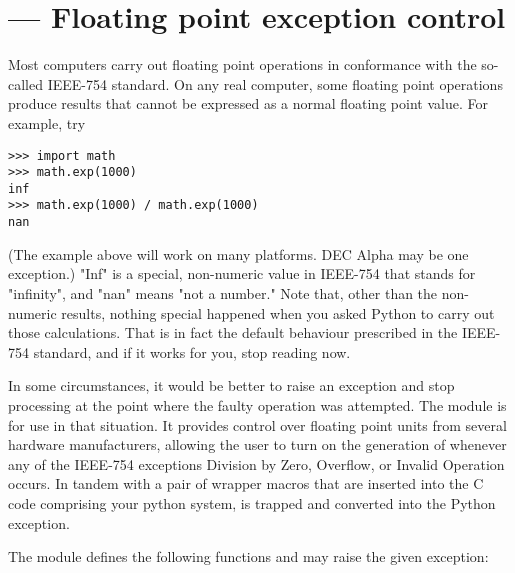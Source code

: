 \section{ ---
         Floating point exception control}



Most computers carry out floating point operations
in conformance with the so-called IEEE-754 standard.
On any real computer,
some floating point operations produce results that cannot
be expressed as a normal floating point value.
For example, try

\begin{verbatim}
>>> import math
>>> math.exp(1000)
inf
>>> math.exp(1000) / math.exp(1000)
nan
\end{verbatim}

(The example above will work on many platforms.
DEC Alpha may be one exception.)
"Inf" is a special, non-numeric value in IEEE-754 that
stands for "infinity", and "nan" means "not a number."
Note that,
other than the non-numeric results,
nothing special happened when you asked Python
to carry out those calculations.
That is in fact the default behaviour prescribed in the IEEE-754 standard,
and if it works for you,
stop reading now.

In some circumstances,
it would be better to raise an exception and stop processing
at the point where the faulty operation was attempted.
The  module
is for use in that situation.
It provides control over floating point
units from several hardware manufacturers,
allowing the user to turn on the generation
of  whenever any of the
IEEE-754 exceptions Division by Zero, Overflow, or
Invalid Operation occurs.
In tandem with a pair of wrapper macros that are inserted
into the C code comprising your python system,
 is trapped and converted into the Python
 exception.

The  module defines the following functions and
may raise the given exception:


